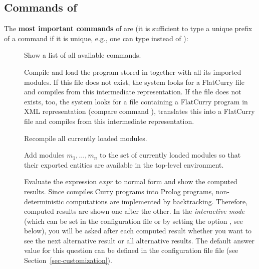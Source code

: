 \subsection{Commands of \CYS}
\label{sec:pakcs-commands}

The {\bf most important commands} of \CYS are
(it is sufficient to type a unique prefix of a command if it is unique,
e.g., one can type  instead of ):

\begin{description}
\item[]
Show a list of all available commands.

\item[]
Compile and load the program stored in 
together with all its imported modules.
If this file does not exist, the system looks for a FlatCurry
file  and compiles from this intermediate representation.
If the file  does not exists, too, the system looks
for a file  containing a FlatCurry program in
XML representation (compare command ),
translates this into a FlatCurry file 
and compiles from this intermediate representation.

\item[]
Recompile all currently loaded modules.

\item[]
Add modules $m_1,\ldots,m_n$ to the set of currently loaded modules
so that their exported entities are available in the top-level environment.

\item[] Evaluate the expression $expr$ to normal form
and show the computed results. Since \CYS
compiles Curry programs into Prolog programs,
non-deterministic computations are implemented by backtracking.
Therefore, computed results are shown one after the other.
In the \emph{interactive mode} (which can be set in the
configuration file \ccode{\curryrc} or by setting the option
, see below), you will be asked
after each computed result whether
you want to see the next alternative result or all alternative results.
The default answer value for this question can be defined
in the configuration file \ccode{\curryrc} file
(see Section~\ref{sec-customization}).


\end{description}

